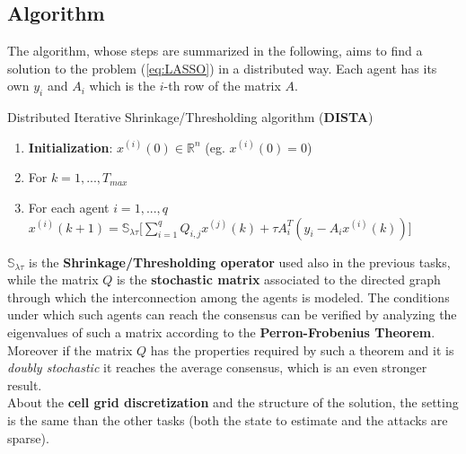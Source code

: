 \vspace{-0.3cm}
\subsection*{Algorithm}
The algorithm, whose steps are summarized in the following, aims to find a solution to the problem (\ref{eq:LASSO}) in a distributed way. Each agent has its own $y_i$ and $A_i$ which is the $i$-th row of the matrix $A$.

\begin{algorithm}
    \caption{Distributed Iterative Shrinkage/Thresholding algorithm (\textbf{DISTA})}
    \begin{enumerate}
        \itemsep-0.3em
        \item \textbf{Initialization}: $x^{(i)}(0)\in \mathbb{R}^n$ (eg. $x^{(i)}(0)=0$) 
        \item For $k=1,..., T_{max}$
        \item For each agent $i=1,...,q \quad$ 
        $x^{(i)}(k+1) = \mathbb{S}_{\lambda\tau} 
            \bigg[ 
                \sum_{i=1}^q Q_{i,j}x^{(j)}(k) +
                \tau A_i^T(y_i-A_ix^{(i)}(k))
            \bigg]$
    \end{enumerate}
    \vspace{-0.4cm}
\end{algorithm}
\noindent
$\mathbb{S}_{\lambda\tau}$ is the \textbf{Shrinkage/Thresholding operator} used also in the previous tasks, while the matrix $Q$ is the \textbf{stochastic matrix} associated to the directed graph through which the interconnection among the agents is modeled. The conditions under which such agents can reach the consensus can be verified by analyzing the eigenvalues of such a matrix according to the \textbf{Perron-Frobenius Theorem}. Moreover if the matrix $Q$ has the properties required by such a theorem and it is \textit{doubly stochastic} it reaches the average consensus, which is an even stronger result.\\
About the \textbf{cell grid discretization} and the structure of the solution, the setting is the same than the other tasks (both the state to estimate and the attacks are sparse).
\vspace{-0.3cm}
